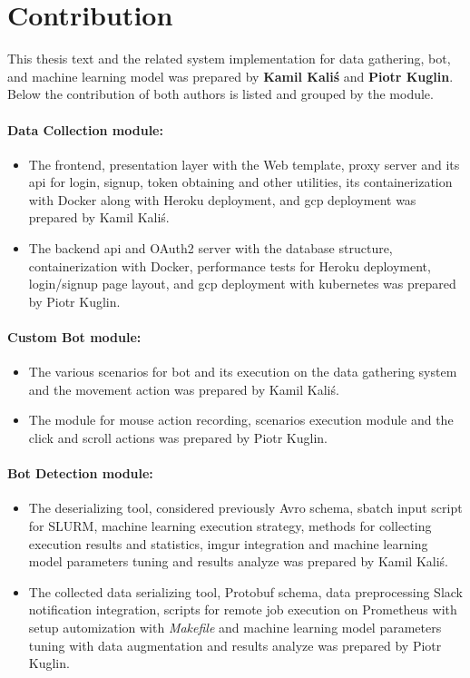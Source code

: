\section{Contribution}\label{sec:contribution}
This thesis text and the related system implementation for data gathering, bot, and machine learning model was prepared by \textbf{Kamil Kaliś} and \textbf{Piotr Kuglin}.
Below the contribution of both authors is listed and grouped by the module.

\paragraph{Data Collection module:}
\begin{itemize}[label=$\bullet$]
    \item The frontend, presentation layer with the Web template, proxy server and its \gls{api} for login, signup, token obtaining and other utilities, its containerization with Docker along with Heroku deployment, and \gls{gcp} deployment was prepared by Kamil Kaliś.
    \item The backend \gls{api} and OAuth2 server with the database structure, containerization with Docker, performance tests for Heroku deployment, login/signup page layout, and \gls{gcp} deployment with kubernetes was prepared by Piotr Kuglin.
\end{itemize}

\paragraph{Custom Bot module:}
\begin{itemize}[label=$\bullet$]
    \item The various scenarios for bot and its execution on the data gathering system and the movement action was prepared by Kamil Kaliś.
    \item The module for mouse action recording, scenarios execution module and the click and scroll actions was prepared by Piotr Kuglin.
\end{itemize}

\paragraph{Bot Detection module:}
\begin{itemize}[label=$\bullet$]
    \item The deserializing tool, considered previously Avro schema, sbatch input script for SLURM, machine learning execution strategy, methods for collecting execution results and statistics, imgur integration and machine learning model parameters tuning and results analyze was prepared by Kamil Kaliś.
    \item The collected data serializing tool, Protobuf schema, data preprocessing Slack notification integration, scripts for remote job execution on Prometheus with setup automization with \textit{Makefile} and machine learning model parameters tuning with data augmentation and results analyze was prepared by Piotr Kuglin.
\end{itemize}

